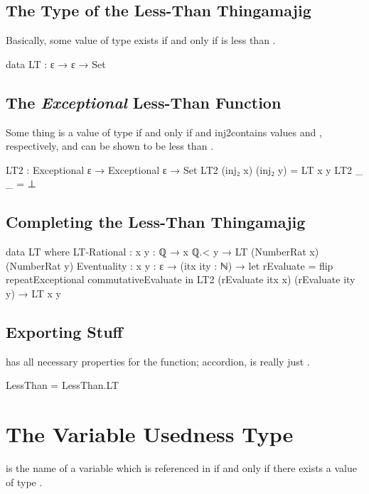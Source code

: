\documentclass{report}
\begin{document}
\section{The Type of the Less-Than Thingamajig}
Basically, some value of type    exists if and only if  is less than .

\begin{code}
    data LT : ε → ε → Set
\end{code}

\section{The \emph{Exceptional} Less-Than Function}
Some thing is a value of type    if and only if  and  \glspl{inj2contain} values  and , respectively, and  can be shown to be less than .

\begin{code}
    LT2 : Exceptional ε → Exceptional ε → Set
    LT2 (inj₂ x) (inj₂ y) = LT x y
    LT2 _ _ = ⊥
\end{code}

\section{Completing the Less-Than Thingamajig}

\begin{code}
    data LT where
      LT-Rational :
        {x y : ℚ} → x ℚ.< y → LT (NumberRat x) (NumberRat y)
      Eventuality :
        {x y : ε} →
        (itx ity : ℕ) →
        let rEvaluate = flip repeatExceptional commutativeEvaluate in
        LT2 (rEvaluate itx x) (rEvaluate ity y) →
        LT x y
\end{code}

\section{Exporting Stuff}
 has all necessary properties for the  function; accordion,  is really just .

\begin{code}
  LessThan = LessThan.LT
\end{code}

\chapter{The Variable Usedness Type}
 is the name of a variable which is referenced in  if and only if there exists a value of type   .
\end{document}
